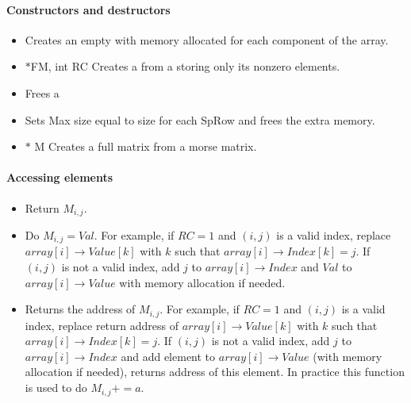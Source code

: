 \paragraph{Constructors and destructors}
\begin{itemize}
\item {}
  \sshortdescribe Creates an empty  with memory
  allocated for each component of the array. 
\item
  { $\ast$FM, int RC}
  \sshortdescribe Creates a  from  a 
  storing only its nonzero elements.

\item {}
  \sshortdescribe Frees a 

\item {}
  \sshortdescribe Sets Max size equal to size for each SpRow and frees the extra
  memory.

\item {}
  {$\ast$ M}
  \sshortdescribe Creates a full matrix from a morse matrix.
\end{itemize}


\paragraph{Accessing elements}
\begin{itemize}
\item {}
  \sshortdescribe Return $M_{i, j}$. 
\item {}
  \sshortdescribe Do $M_{i, j} = Val$. For example, if $RC=1$ and $(i, j)$ is a valid index, replace
  $array[i]\rightarrow Value[k]$ with $k$ such that $array[i]\rightarrow Index[k]=j$.
  If $(i, j)$ is not a valid index, add $j$ to $array[i]\rightarrow Index$ and $Val$ to
  $array[i] \rightarrow Value$ with memory allocation if needed. 
\item {}
  \sshortdescribe Returns the address of $M_{i, j}$. For example, 
  if $RC=1$ and $(i, j)$ is a valid index, replace return address of
  $array[i]\rightarrow Value[k]$ with $k$ such that $array[i]\rightarrow
  Index[k]=j$.  If $(i, j)$ is not a valid index, add $j$ to
  $array[i]\rightarrow Index$ and add element to $array[i] \rightarrow Value$
  (with memory allocation if needed), returns address of this element. In
  practice this function is used to do $M_{i, j} += a$.
\end{itemize}

